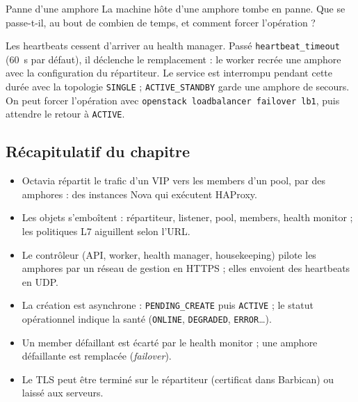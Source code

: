\begin{exercice}{Panne d'une amphore}\label{ex:oc-panne}
La machine hôte d'une amphore tombe en panne. Que se passe-t-il, au bout de combien de temps, et comment forcer l'opération ?
\end{exercice}
\begin{correction}
Les heartbeats cessent d'arriver au health manager. Passé \texttt{heartbeat\_\allowbreak timeout} (60~s par défaut), il déclenche le
remplacement : le worker recrée une amphore avec la configuration du répartiteur. Le service est interrompu pendant cette
durée avec la topologie \texttt{SINGLE} ; \texttt{ACTIVE\_\allowbreak STANDBY} garde une amphore de secours. On peut forcer
l'opération avec \texttt{openstack loadbalancer failover lb1}, puis attendre le retour à \texttt{ACTIVE}.
\end{correction}

\subsection{Récapitulatif du chapitre}\label{sec:oc-recap}

\begin{aretenir}
\begin{itemize}
  \item Octavia répartit le trafic d'un VIP vers les members d'un pool, par des amphores : des instances Nova qui
        exécutent HAProxy.
  \item Les objets s'emboîtent : répartiteur, listener, pool, members, health monitor ; les politiques L7 aiguillent selon
        l'URL.
  \item Le contrôleur (API, worker, health manager, housekeeping) pilote les amphores par un réseau de gestion en HTTPS ;
        elles envoient des heartbeats en UDP.
  \item La création est asynchrone : \texttt{PENDING\_\allowbreak CREATE} puis \texttt{ACTIVE} ; le statut opérationnel indique
        la santé (\texttt{ONLINE}, \texttt{DEGRADED}, \texttt{ERROR}\dots).
  \item Un member défaillant est écarté par le health monitor ; une amphore défaillante est remplacée (\emph{failover}).
  \item Le TLS peut être terminé sur le répartiteur (certificat dans Barbican) ou laissé aux serveurs.
\end{itemize}
\end{aretenir}

